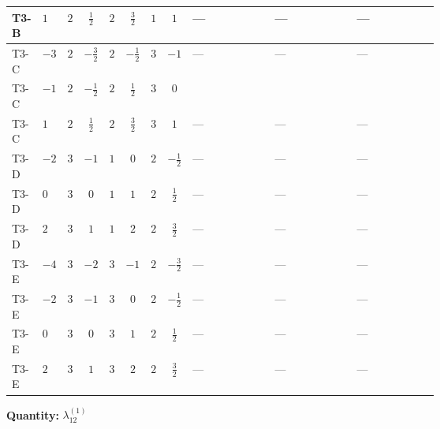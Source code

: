 \documentclass[8pt]{article}
\begin{document}
\begin{landscape}
\begin{longtable}{@{}llcccccc >{\raggedright\arraybackslash}p{0.21\linewidth} >{\raggedright\arraybackslash}p{0.21\linewidth} >{\raggedright\arraybackslash}p{0.21\linewidth}@{}}
\midrule
T3-B & $1$ & $2$ & $\frac{1}{2}$ & $2$ & $\frac{3}{2}$ & $1$ & $1$ & --- & --- & --- \\
\midrule
T3-C & $-3$ & $2$ & $-\frac{3}{2}$ & $2$ & $-\frac{1}{2}$ & $3$ & $-1$ & --- & --- & --- \\
\midrule
T3-C & $-1$ & $2$ & $-\frac{1}{2}$ & $2$ & $\frac{1}{2}$ & $3$ & $0$ & \scriptsize\adjustbox{max width=\linewidth}{$\begin{gathered} +\frac{9}{4} (\left({\lambda_{10}}\right)^{*}+\left({\lambda_{11}}\right)^{*}) \operatorname{Tr}\!\left({y_2}\,\left({y_1}\right)^{\dagger}\right)\end{gathered}$} & \scriptsize\adjustbox{max width=\linewidth}{$\begin{gathered} -3 \operatorname{Tr}\!\left({y_1}\,\left({y_2}\right)^{\dagger}\,{y_2}\,\left({y_1}\right)^{\dagger}\right)\end{gathered}$} & \scriptsize\adjustbox{max width=\linewidth}{$\begin{gathered} +2 {\lambda_{H H^\dagger S_1^\dagger S_2^\dagger}^{\rm Cross}} \left({\lambda_{H H^\dagger S_1^\dagger S_2^\dagger}^{\rm Cross}}\right)^{*}\end{gathered}$} \\
\midrule
T3-C & $1$ & $2$ & $\frac{1}{2}$ & $2$ & $\frac{3}{2}$ & $3$ & $1$ & --- & --- & --- \\
\midrule
T3-D & $-2$ & $3$ & $-1$ & $1$ & $0$ & $2$ & $-\frac{1}{2}$ & --- & --- & --- \\
\midrule
T3-D & $0$ & $3$ & $0$ & $1$ & $1$ & $2$ & $\frac{1}{2}$ & --- & --- & --- \\
\midrule
T3-D & $2$ & $3$ & $1$ & $1$ & $2$ & $2$ & $\frac{3}{2}$ & --- & --- & --- \\
\midrule
T3-E & $-4$ & $3$ & $-2$ & $3$ & $-1$ & $2$ & $-\frac{3}{2}$ & --- & --- & --- \\
\midrule
T3-E & $-2$ & $3$ & $-1$ & $3$ & $0$ & $2$ & $-\frac{1}{2}$ & --- & --- & --- \\
\midrule
T3-E & $0$ & $3$ & $0$ & $3$ & $1$ & $2$ & $\frac{1}{2}$ & --- & --- & --- \\
\midrule
T3-E & $2$ & $3$ & $1$ & $3$ & $2$ & $2$ & $\frac{3}{2}$ & --- & --- & --- \\
\midrule
\bottomrule
\end{longtable}
\clearpage
\noindent\textbf{Quantity: }$\lambda_{12}^{(1)}$\par\smallskip

\end{landscape}
\end{document}
